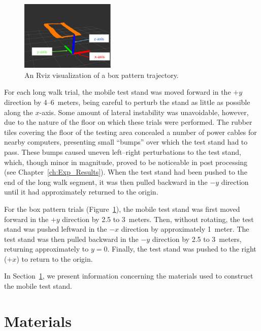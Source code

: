 \begin{figure}
  \centering
    \includegraphics[width=0.4\textwidth]{good_box_5_cropped}
  \caption[Rviz Visualization of a Box Pattern Trajectory]{An Rviz visualization of a box pattern trajectory.}
  \label{fig:good_box}
\end{figure}

For each long walk trial, the mobile test stand was moved forward in the $+y$ direction by 4--6~meters, being careful to perturb the stand as little as possible along the $x$-axis. Some amount of lateral instability was unavoidable, however, due to the nature of the floor on which these trials were performed. The rubber tiles covering the floor of the testing area concealed a number of power cables for nearby computers, presenting small ``bumps'' over which the test stand had to pass. These bumps caused uneven left--right perturbations to the test stand, which, though minor in magnitude, proved to be noticeable in post processing (see Chapter~\ref{ch:Exp_Results}). When the test stand had been pushed to the end of the long walk segment, it was then pulled backward in the $-y$ direction until it had approximately returned to the origin.

For the box pattern trials (Figure~\ref{fig:good_box}), the mobile test stand was first moved forward in the $+y$ direction by 2.5 to 3~meters. Then, without rotating, the test stand was pushed leftward in the $-x$ direction by approximately 1~meter. The test stand was then pulled backward in the $-y$ direction by 2.5 to 3~meters, returning approximately to $y = 0$. Finally, the test stand was pushed to the right ($+x$) to return to the origin.

In Section~\ref{sec:materials}, we present information concerning the materials used to construct the mobile test stand.

\pagebreak
\section{Materials} \label{sec:materials}
